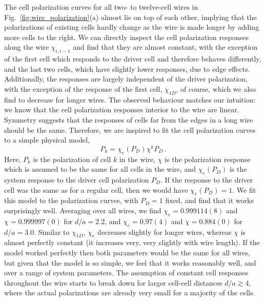 The cell polarization curves for all two- to twelve-cell wires in
Fig.~\ref{fig:wire_polarization}(a) almost lie on top of each other, implying
that the polarizations of existing cells hardly change as the wire is made
longer by adding more cells to the right. We can directly inspect the cell
polarization responses along the wire $\chi_{i,i-1}$ and find that they are
almost constant, with the exception of the first cell which responds to the
driver cell and therefore behaves differently, and the last two cells, which
have slightly lower responses, due to edge effects. Additionally, the responses
are largely independent of the driver polarization, with the exception of the
response of the first cell, $\chi_{1D}$, of course, which we also find to
decrease for longer wires. The observed behaviour matches our intuition: we
know that the cell polarization responses interior to the wire are linear.
Symmetry suggests that the responses of cells far from the edges in a long wire
should be the same. Therefore, we are inspired to fit the cell polarization
curves to a simple physical model, 
%
\begin{equation}
  \label{eq:simple_model}
  P_k = \chi_e(P_D) \chi^k P_D \, .
\end{equation}
%
Here, $P_k$ is the polarization of cell $k$ in the wire, $\chi$ is the
polarization response which is assumed to be the same for all cells in the wire,
and $\chi_e(P_D)$ is the system response to the driver cell polarization $P_D$.
If the response to the driver cell was the same as for a regular cell, then we
would have $\chi_e(P_D) = 1$. We fit this model to the polarization curves, with
$P_D = 1$ fixed, and find that it works surprisingly well. Averaging over all
wires, we find $\chi_e = 0.999114(8)$ and $\chi = 0.999997(0)$ for $d/a=2.2$,
and $\chi_e = 0.97(4)$ and $\chi = 0.884(0)$ for $d/a = 3.0$. Similar to
$\chi_{1D}$, $\chi_e$ decreases slightly for longer wires, whereas $\chi$ is
almost perfectly constant (it increases very, very slightly with wire length).
If the model worked perfectly then both parameters would be the same for all
wires, but given that the model is so simple, we feel that it works reasonably
well, and over a range of system parameters. The assumption of constant cell
responses throughout the wire starts to break down for larger cell-cell
distances $d/a \gtrsim 4$, where the actual polarizations are already very small
for a majority of the cells.

